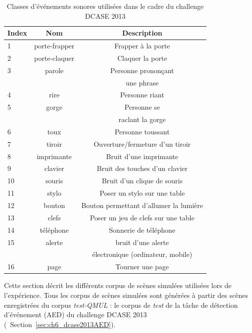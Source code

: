 \begin{table}[t]
\begin{center}
\begin{tabular}{lcc}
\textbf{Index} & \textbf{Nom}  & \textbf{Description}  \\ 
\hline
1   & porte-frapper & Frapper à la porte \\
2   & porte-claquer & Claquer la porte \\
3   & parole        & Personne  prononçant \\
    &               &  une phrase \\
4   & rire          & Personne riant  \\    
5   & gorge         & Personne se   \\
    &               & raclant la gorge \\
6   & toux          & Personne toussant \\
7   & tiroir        & Ouverture/fermeture d'un tiroir \\
8   & imprimante    & Bruit d'une imprimante \\
9   & clavier       & Bruit des touches d'un clavier \\
10  & souris        & Bruit d'un clique de souris \\
11  & stylo         & Poser un stylo sur une table \\
12  & bouton        & Bouton permettant d'allumer la lumière \\
13  & clefs         & Poser un jeu de clefs sur une table \\    
14  & téléphone     & Sonnerie de téléphone \\
15  & alerte        & bruit d'une alerte \\
    &               & électronique  (ordinateur, mobile) \\
16  & page          & Tourner une page \\     
\hline      
\end{tabular}
\end{center}
\label{tab:eventDCASE2013}
\caption{Classes d'événements sonores utilisées dans le cadre du challenge DCASE 2013}
\end{table}

Cette section décrit les différents corpus de scènes simulées utilisées lors de l'expérience. Tous les corpus  de scènes simulées sont générées à partir des scènes enregistrées du corpus \emph{test-QMUL} : le corpus de \emph{test} de la tâche de détection d'événement (AED) du challenge DCASE 2013  \citep{giannoulis2013detection} (\cf~Section~\ref{sec:ch6_dcase2013AED}). 


